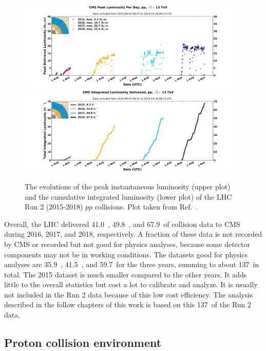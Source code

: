 \begin{figure}[!htb]
    \centering
    \captionsetup{justification=justified}
    \includegraphics[width=0.95\textwidth]{pics/LHC_CMS/peak_lumi_pp_run2.png}
    \includegraphics[width=0.95\textwidth]{pics/LHC_CMS/int_lumi_cumulative_pp_1_run2.png}
    \caption{The evolutions of the peak instantaneous luminosity (upper plot) and the cumulative integrated luminosity (lower plot)
             of the LHC Run 2 (2015-2018) $pp$ collisions.
             Plot taken from Ref.~\cite{lhc_lumi_pub}.}
    \label{fig:lhc_lumi}
\end{figure}

Overall, the LHC delivered 41.0~\invfb, 49.8~\invfb, and 67.9~\invfb of collision data to CMS during 2016, 2017, and 2018, respectively.
A fraction of these data is not recorded by CMS or recorded but not good for physics analyses, because some detector components may not be in working conditions.
The datasets good for physics analyses are 35.9~\invfb, 41.5~\invfb, and 59.7~\invfb for the three years, summing to about 137~\invfb in total.
The 2015 dataset is much smaller compared to the other years.
It adds little to the overall statistics but cost a lot to calibrate and analyze.
It is usually not included in the Run 2 data because of this low cost efficiency.
The \hmm analysis described in the follow chapters of this work is based on this 137~\invfb of the Run 2 data.


\subsection{Proton collision environment}\label{sec:pp_env}

